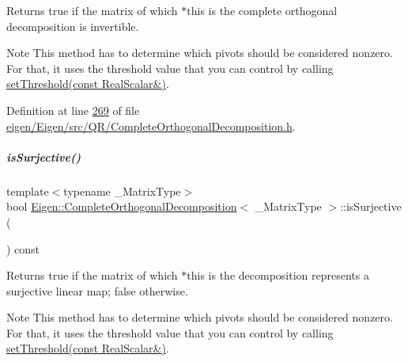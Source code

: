 \begin{DoxyReturn}{Returns}
true if the matrix of which $\ast$this is the complete orthogonal decomposition is invertible.
\end{DoxyReturn}
\begin{DoxyNote}{Note}
This method has to determine which pivots should be considered nonzero. For that, it uses the threshold value that you can control by calling \hyperlink{group___q_r___module_aa9c9f7cbde9d58ca5552381b70ad8d82}{set\+Threshold(const Real\+Scalar\&)}. 
\end{DoxyNote}


Definition at line \hyperlink{eigen_2_eigen_2src_2_q_r_2_complete_orthogonal_decomposition_8h_source_l00269}{269} of file \hyperlink{eigen_2_eigen_2src_2_q_r_2_complete_orthogonal_decomposition_8h_source}{eigen/\+Eigen/src/\+Q\+R/\+Complete\+Orthogonal\+Decomposition.\+h}.

\mbox{\label{group___q_r___module_a53dd287d3e1bbc548595d63880fd51bf}} 
\subparagraph{\texorpdfstring{is\+Surjective()}{isSurjective()}\hspace{0.1cm}{\footnotesize\ttfamily [1/2]}}
{\footnotesize\ttfamily template$<$typename \+\_\+\+Matrix\+Type$>$ \\
bool \hyperlink{group___q_r___module_class_eigen_1_1_complete_orthogonal_decomposition}{Eigen\+::\+Complete\+Orthogonal\+Decomposition}$<$ \+\_\+\+Matrix\+Type $>$\+::is\+Surjective (\begin{DoxyParamCaption}{ }\end{DoxyParamCaption}) const\hspace{0.3cm}{\ttfamily [inline]}}

\begin{DoxyReturn}{Returns}
true if the matrix of which $\ast$this is the decomposition represents a surjective linear map; false otherwise.
\end{DoxyReturn}
\begin{DoxyNote}{Note}
This method has to determine which pivots should be considered nonzero. For that, it uses the threshold value that you can control by calling \hyperlink{group___q_r___module_aa9c9f7cbde9d58ca5552381b70ad8d82}{set\+Threshold(const Real\+Scalar\&)}. 
\end{DoxyNote}


